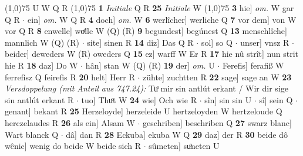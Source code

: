 \documentclass[8pt,a4paper,notitlepage]{article}
\begin{document}
\begin{table}[ht]
\begin{minipage}[t]{0.5\linewidth}
\begin{tabular}{rl}
\end{tabular}
\scriptsize
\line(1,0){75} \newline
U W Q R \newline
\line(1,0){75} \newline
\textbf{1} \textit{Initiale} Q R  \textbf{25} \textit{Initiale} W  \newline
\line(1,0){75} \newline
\textbf{3} hie] \textit{om.} W gar Q R  $\cdot$ ein] \textit{om.} W Q R \textbf{4} doch] \textit{om.} W \textbf{6} werlîcher] werliche Q \textbf{7} vor dem] von W vor Q R \textbf{8} enwelle] woͤlle W (Q) (R) \textbf{9} begundest] begúnest Q \textbf{13} menschlîche] mannlich W (Q) (R)  $\cdot$ site] sinen R \textbf{14} diz] Das Q R  $\cdot$ sol] so Q  $\cdot$ unser] vnsz R  $\cdot$ beider] deweders W (R) oweders Q \textbf{15} ez] warff W Er R \textbf{17} hie nû strît] nun strit hie R \textbf{18} daz] Do W  $\cdot$ hân] stan W (Q) (R) \textbf{19} der] \textit{om.} U  $\cdot$ Ferefis] ferafiß W ferrefisz Q feirefis R \textbf{20} helt] Herr R  $\cdot$ zühte] zuchtten R \textbf{22} sage] sage an W \textbf{23} \textit{Versdoppelung (mit Anteil aus 747.24):} Tuͦ mir sin antlút erkant / Wir dir sige sin antlút erkant R   $\cdot$ tuo] Thuͦt W \textbf{24} wie] Och wie R  $\cdot$ sîn] sin sin U  $\cdot$ sî] sein Q  $\cdot$ genant] bekant R \textbf{25} Herzeloyde] herzeleide U hertzeloyden W hertzeloude Q herczelaudes R \textbf{26} als ein] Alsam W  $\cdot$ geschriben] beschriben Q \textbf{27} swarz blanc] Wart blanck Q  $\cdot$ dâ] dan R \textbf{28} Eckuba] ekuba W Q \textbf{29} daz] der R \textbf{30} beide dô wênic] wenig do beide W beide sich R  $\cdot$ sûmeten] suͦneten U \newline
\end{minipage}
\end{table}
\end{document}
